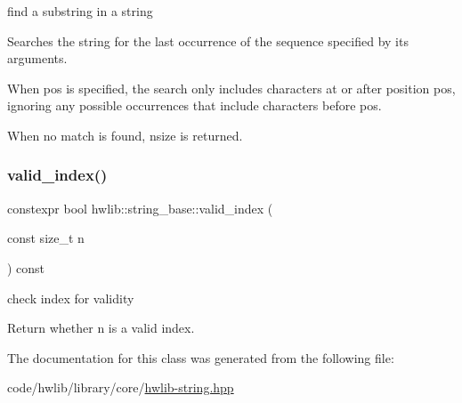 find a substring in a string

Searches the string for the last occurrence of the sequence specified by its arguments.

When pos is specified, the search only includes characters at or after position pos, ignoring any possible occurrences that include characters before pos.

When no match is found, nsize is returned. \mbox{\label{classhwlib_1_1string__base_ac643906a4a4e6ff3ac680eb704ce7506}} 
\subsubsection{\texorpdfstring{valid\+\_\+index()}{valid\_index()}}
{\footnotesize\ttfamily constexpr bool hwlib\+::string\+\_\+base\+::valid\+\_\+index (\begin{DoxyParamCaption}\item[{const size\+\_\+t}]{n }\end{DoxyParamCaption}) const\hspace{0.3cm}{\ttfamily [inline]}}

check index for validity

Return whether n is a valid index. 

The documentation for this class was generated from the following file\+:\begin{DoxyCompactItemize}
\item 
code/hwlib/library/core/\hyperlink{hwlib-string_8hpp}{hwlib-\/string.\+hpp}\end{DoxyCompactItemize}
